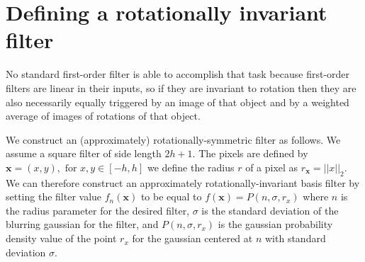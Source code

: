 \documentclass{article}
\begin{document}
\section{Defining a rotationally invariant filter}
No standard first-order filter is able to accomplish that task because first-order filters are linear in their inputs, so if they are invariant to rotation then they are also necessarily equally triggered by an image of that object and by a weighted average of images of rotations of that object.

We construct an (approximately) rotationally-symmetric filter as follows. 
We assume a square filter of side length $2h + 1$. 
The pixels are defined by $\mathbf x = (x,y),\text{ for } x,y\in [-h,h]$ we define the radius $r$ of a pixel as $r_{\mathbf{x}} = ||x||_2$. 
We can therefore construct an approximately rotationally-invariant basis filter by setting the filter value $f_n(\mathbf{x})$ to be equal to
$f(\mathbf{x}) = P(n,\sigma,r_x)$ 
where $n$ is the radius parameter for the desired filter, $\sigma$ is the standard deviation of the blurring gaussian for the filter, and $P(n, \sigma, r_x)$ is the gaussian probability density value of the point $r_x$ for the gaussian centered at $n$ with standard deviation $\sigma$.

{}

\end{document}
